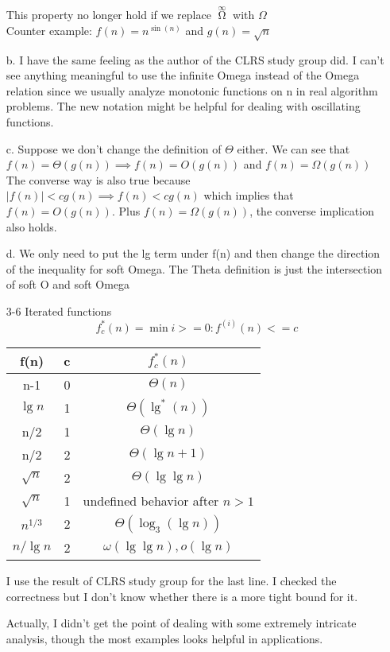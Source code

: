 \documentclass[]{article}
\begin{document}
\begin{enumerate}
This property no longer hold if we replace $ \mathop{\Omega}\limits^{\infty} $ with $ \Omega $\\
Counter example: $ f(n) = n^{\sin(n)} $ and $ g(n) = \sqrt{n} $

b. I have the same feeling as the author of the CLRS study group did. I can't see anything meaningful to use the infinite Omega instead of the Omega relation since we usually analyze monotonic functions on n in real algorithm problems. The new notation might be helpful for dealing with oscillating functions. 

c. Suppose we don't change the definition of $ \Theta $ either. We can see that $ f(n) = \Theta(g(n)) \implies f(n) = O(g(n)) $ and $ f(n) = \Omega(g(n)) $\\
The converse way is also true because $ |f(n)|<cg(n) \implies f(n) < cg(n) $ which implies that $ f(n) = O(g(n)) $. Plus $ f(n) = \Omega(g(n)) $, the converse implication also holds.

d. We only need to put the lg term under f(n) and then change the direction of the inequality for soft Omega. The Theta definition is just the intersection of soft O and soft Omega

\item[3-6] Iterated functions\\
$$ f_c^*(n) = \min{i>=0: f^{(i)}(n)<=c} $$
\begin{tabular}{|c|c|c|}
\hline
f(n) & c & $ f_c^*(n) $\\
\hline
n-1 & 0 & $ \Theta(n) $\\
\hline
$\lg n$ & 1 & $ \Theta(\lg^*(n)) $\\
\hline
n/2 & 1 & $ \Theta(\lg n) $\\
\hline
n/2 & 2 & $ \Theta(\lg n +1) $\\
\hline
$\sqrt{n}$ & 2 & $ \Theta(\lg \lg n) $\\
\hline
$ \sqrt{n} $ & 1 & undefined behavior after $ n>1 $\\
\hline
$ n^{1/3} $ & 2 & $ \Theta(\log_3(\lg n)) $\\
\hline
$ n/\lg n $ & 2 & $ \omega(\lg\lg n), o(\lg n) $\\
\hline
\end{tabular}

I use the result of CLRS study group for the last line. I checked the correctness but I don't know whether there is a more tight bound for it.

Actually, I didn't get the point of dealing with some extremely intricate analysis, though the most examples looks helpful in applications.
\end{enumerate}
\end{document}
